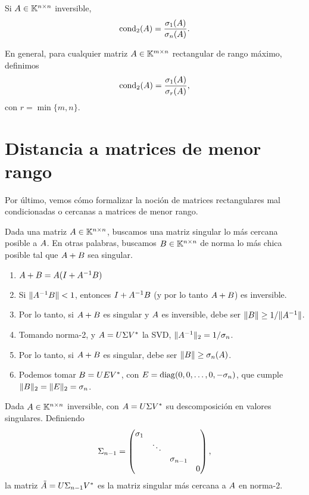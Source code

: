 \begin{corolario}
Si $\Ab \in \K^{n \times n}$ inversible,
$$
\cond_2(\Ab) = \frac{\sigma_1(\Ab)}{\sigma_n(\Ab)}.
$$
\end{corolario}

En general, para cualquier matriz $\Ab \in \K^{m \times n}$ rectangular de rango máximo, definimos $$\cond_2(\Ab) = \frac{\sigma_1(\Ab)}{\sigma_r(\Ab)},$$
con $r = \min\{m,n\}$.

\section{Distancia a matrices de menor rango}

Por último, vemos cómo formalizar la noción de matrices rectangulares mal condicionadas o cercanas a matrices de menor rango.

Dada una matriz $\Ab \in \K^{n \times n}$, buscamos una matriz singular lo más cercana posible a $\Ab$.
En otras palabras, buscamos $\Bb \in \K^{n \times n}$ de norma lo más chica posible tal que $\Ab + \Bb$ sea singular.

\begin{enumerate}
\item $\Ab + \Bb = \Ab (\Ib + \Ab^{-1} \Bb)$
\item Si $\|\Ab^{-1}\Bb\| < 1$, entonces $\Ib + \Ab^{-1}\Bb$ (y por lo tanto $\Ab+\Bb$) es inversible.
\item Por lo tanto, si $\Ab + \Bb$ es singular y $\Ab$ es inversible, debe ser $\|\Bb\| \ge 1 / \|\Ab^{-1}\|$.
\item Tomando norma-2, y $\Ab = \Ub \Sigmab \Vb^*$ la SVD, $\|\Ab^{-1}\|_2 = 1/\sigma_n$.
\item Por lo tanto, si $\Ab+\Bb$ es singular, debe ser $\|\Bb\| \ge \sigma_n(\Ab)$.
\item Podemos tomar $\Bb = \Ub \Eb \Vb^*$, con $\Eb = \diag(0, 0, \dots, 0, -\sigma_n)$, que cumple $\|\Bb\|_2 = \|\Eb\|_2 = \sigma_n$.
\end{enumerate}

\begin{teorema}
Dada $\Ab \in \K^{n \times n}$ inversible, con $\Ab = \Ub \Sigmab \Vb^*$ su descomposición en valores singulares.
Definiendo
{\small
$$\Sigmab_{n-1} =
\begin{pmatrix}
\sigma_1 & & & \\
 & \ddots & & \\
 & & \sigma_{n-1} & \\
 & &  & 0
\end{pmatrix},
$$
}
la matriz $\tilde \Ab = \Ub \Sigmab_{n-1} \Vb^*$ es la matriz singular m\'as cercana a $\Ab$ en norma-2.
\end{teorema}

